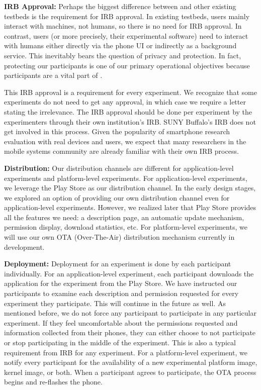 {\bf IRB Approval:} Perhaps the biggest difference between \PhoneLab{} and other
existing testbeds is the requirement for IRB approval. In existing testbeds,
users mainly interact with machines, not humans, so there is no need for IRB
approval. In contrast, \PhoneLab{} users (or more precisely, their experimental
software) need to interact with humans either directly via the phone UI or
indirectly as a background service. This inevitably bears the question of
privacy and protection. In fact, protecting our participants is one of our
primary operational objectives because participants are a vital part of
\PhoneLab{}.

This IRB approval is a requirement for every experiment. We recognize that some
experiments do not need to get any approval, in which case we require a letter
stating the irrelevance. The IRB approval should be done per experiment by the
experimenters through their own institution's IRB. SUNY Buffalo's IRB does not
get involved in this process. Given the popularity of smartphone research
evaluation with real devices and users, we expect that many researchers in the
mobile systems community are already familiar with their own IRB process.

{\bf Distribution:} Our distribution channels are different for
application-level experiments and platform-level experiments. For
application-level experiments, we leverage the Play Store as our distribution
channel. In the early design stages, we explored an option of providing our own
distribution channel even for application-level experiments. However, we
realized later that Play Store provides all the features we need: a description
page, an automatic update mechanism, permission display, download statistics,
etc. For platform-level experiments, we will use our own OTA (Over-The-Air)
distribution mechanism currently in development.

{\bf Deployment:} Deployment for an experiment is done by each participant
individually. For an application-level experiment, each participant downloads
the application for the experiment from the Play Store. We have instructed our
participants to examine each description and permission requested for every
experiment they participate. This will continue in the future as well. As
mentioned before, we do not force any participant to participate in any
particular experiment. If they feel uncomfortable about the permissions
requested and information collected from their phones, they can either choose to
not participate or stop participating in the middle of the experiment. This is
also a typical requirement from IRB for any experiment. For a platform-level
experiment, we notify every participant for the availability of a new
experimental platform image, kernel image, or both. When a participant agrees to
participate, the OTA process begins and re-flashes the phone.

